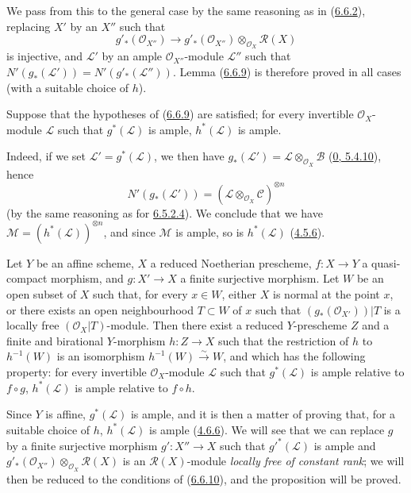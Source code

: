We pass from this to the general case by the same reasoning as in
(\hyperref[II.6.6.2]{6.6.2}), replacing $X'$ by an $X''$ such that
\[
g'_*(\mathcal{O}_{X''})\longrightarrow
g'_*(\mathcal{O}_{X''})\otimes_{\mathcal{O}_X}\mathcal{R}(X)
\]
is injective, and $\mathcal{L}'$ by an ample $\mathcal{O}_{X''}$-module
$\mathcal{L}''$ such that
$N'(g_*(\mathcal{L}'))=N'(g'_*(\mathcal{L}''))$. Lemma
(\hyperref[II.6.6.9]{6.6.9}) is therefore proved in all cases (with a
suitable choice of $h$).

\begin{corollary}[6.6.10]
\label{II.6.6.10}
Suppose that the hypotheses of
(\hyperref[II.6.6.9]{6.6.9}) are satisfied; for every invertible
$\mathcal{O}_X$-module $\mathcal{L}$ such that $g^*(\mathcal{L})$ is ample,
$h^*(\mathcal{L})$ is ample.
\end{corollary}

Indeed, if we set $\mathcal{L}'=g^*(\mathcal{L})$, we then have
$g_*(\mathcal{L}')=\mathcal{L}\otimes_{\mathcal{O}_X}\mathcal{B}$
(\hyperref[0.5.4.10]{0, 5.4.10}), hence
\[
N'(g_*(\mathcal{L}'))=
(\mathcal{L}\otimes_{\mathcal{O}_X}\mathcal{C})^{\otimes n}
\]
(by the same reasoning as for
\hyperref[II.6.5.2.4]{6.5.2.4}). We conclude that we have
$\mathcal{M}=(h^*(\mathcal{L}))^{\otimes n}$, and since $\mathcal{M}$ is
ample, so is $h^*(\mathcal{L})$
(\hyperref[II.4.5.6]{4.5.6}).

\begin{proposition}[6.6.11]
\label{II.6.6.11}
Let $Y$ be an affine scheme, $X$ a reduced Noetherian prescheme,
$f:X\to Y$ a quasi-compact morphism, and $g:X'\to X$ a finite surjective
morphism. Let $W$ be an open subset of $X$ such that, for every $x\in W$,
either $X$ is normal at the point $x$, or there exists an open neighbourhood
$T\subset W$ of $x$ such that $(g_*(\mathcal{O}_{X'}))|T$ is a locally free
$(\mathcal{O}_X|T)$-module. Then there exist a
reduced $Y$-prescheme $Z$ and a finite and birational $Y$-morphism
$h:Z\to X$ such that the restriction of $h$ to $h^{-1}(W)$ is an isomorphism
$h^{-1}(W)\xrightarrow{\sim}W$, and which has the following property: for
every invertible $\mathcal{O}_X$-module $\mathcal{L}$ such that
$g^*(\mathcal{L})$ is ample relative to $f\circ g$, $h^*(\mathcal{L})$
is ample relative to $f\circ h$.
\end{proposition}

Since $Y$ is affine, $g^*(\mathcal{L})$ is ample, and it is then a matter of
proving that, for a suitable choice of $h$, $h^*(\mathcal{L})$ is ample
(\hyperref[II.4.6.6]{4.6.6}). We will see that we can replace $g$
by a finite surjective morphism $g':X''\to X$ such that
${g'}^*(\mathcal{L})$ is ample and
$g'_*(\mathcal{O}_{X''})\otimes_{\mathcal{O}_X}\mathcal{R}(X)$ is an
$\mathcal{R}(X)$-module \emph{locally free of constant rank}; we will
then be reduced to the conditions of (\hyperref[II.6.6.10]{6.6.10}), and the
proposition will be proved.

